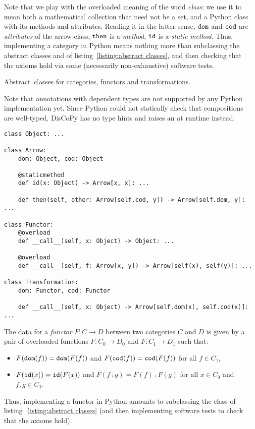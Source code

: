 Note that we play with the overloaded meaning of the word \emph{class}: we use it to mean both a mathematical collection that need not be a set, and a Python class with its methods and attributes.
Reading it in the latter sense, $\mathtt{dom}$ and $\mathtt{cod}$ are \emph{attributes} of the arrow class, $\mathtt{then}$ is a \emph{method}, $\mathtt{id}$ is a \emph{static method}.
Thus, implementing a category in Python means nothing more than subclassing the  abstract classes  and  of listing~\ref{listing:abstract classes}, and then checking that the axioms hold via some (necessarily non-exhaustive) software tests.

\begin{python}\label{listing:abstract classes}
{\normalfont Abstract classes for categories, functors and transformations.}

Note that annotations with dependent types are not supported by any Python implementation yet.
Since Python could not statically check that compositions are well-typed, DisCoPy has no type hints and raises an  at runtime instead.
\begin{verbatim}
class Object: ...

class Arrow:
    dom: Object, cod: Object

    @staticmethod
    def id(x: Object) -> Arrow[x, x]: ...

    def then(self, other: Arrow[self.cod, y]) -> Arrow[self.dom, y]: ...

class Functor:
    @overload
    def __call__(self, x: Object) -> Object: ...

    @overload
    def __call__(self, f: Arrow[x, y]) -> Arrow[self(x), self(y)]: ...

class Transformation:
    dom: Functor, cod: Functor

    def __call__(self, x: Object) -> Arrow[self.dom(x), self.cod(x)]: ...
\end{verbatim}
\end{python}

The data for a \emph{functor} $F : C \to D$ between two categories $C$ and $D$ is given by a pair of overloaded functions $F : C_0 \to D_0$ and $F : C_1 \to D_1$ such that:
\begin{itemize}
    \item $F(\mathtt{dom}(f)) = \mathtt{dom}(F(f))$ and $F(\mathtt{cod}(f)) = \mathtt{cod}(F(f))$ for all $f \in C_1$,
    \item $F(\mathtt{id}(x)) = \mathtt{id}(F(x))$ and $F(f \fcmp g) = F(f) \fcmp F(g)$ for all $x \in C_0$ and $f, g \in C_1$.
\end{itemize}
Thus, implementing a functor in Python amounts to subclassing the  class of listing~\ref{listing:abstract classes} (and then implementing software tests to check that the axioms hold).

